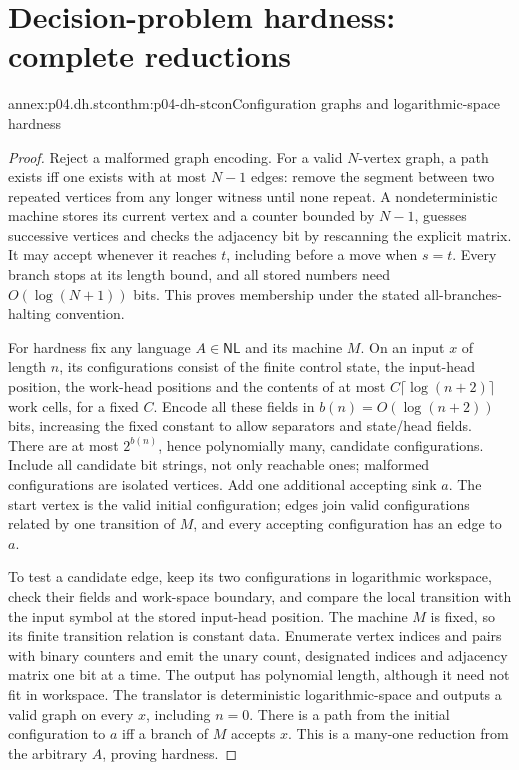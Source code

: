 \section{Decision-problem hardness: complete reductions}
\label{sec:annex-p04-decision-hardness}

\begin{annexitem}{annex:p04.dh.stcon}{thm:p04-dh-stcon}{Configuration graphs and logarithmic-space hardness}
\begin{proof}
Reject a malformed graph encoding. For a valid \(N\)-vertex graph, a path
exists iff one exists with at most \(N-1\) edges: remove the segment between
two repeated vertices from any longer witness until none repeat. A
nondeterministic machine stores its current vertex and a counter bounded
by \(N-1\), guesses successive vertices and checks the adjacency bit by
rescanning the explicit matrix. It may accept whenever it reaches \(t\),
including before a move when \(s=t\). Every branch stops at its length
bound, and all stored numbers need \(O(\log(N+1))\) bits. This proves
membership under the stated all-branches-halting convention.

For hardness fix any language \(A\in\mathsf{NL}\) and its machine \(M\).
On an input \(x\) of length \(n\), its configurations consist of the finite
control state, the input-head position, the work-head positions and the
contents of at most \(C\lceil\log(n+2)\rceil\) work cells, for a fixed \(C\).
Encode all these fields in \(b(n)=O(\log(n+2))\) bits, increasing the fixed
constant to allow separators and state/head fields. There are at most
\(2^{b(n)}\), hence polynomially many, candidate configurations. Include
all candidate bit strings, not only reachable ones; malformed configurations
are isolated vertices. Add one additional accepting sink \(a\).
The start vertex is the valid initial configuration; edges join valid
configurations related by one transition of \(M\), and every accepting
configuration has an edge to \(a\).

To test a candidate edge, keep its two configurations in logarithmic
workspace, check their fields and work-space boundary, and compare the
local transition with the input symbol at the stored input-head position.
The machine \(M\) is fixed, so its finite transition relation is constant
data. Enumerate vertex indices and pairs with binary counters and emit the
unary count, designated indices and adjacency matrix one bit at a time.
The output has polynomial length, although it need not fit in workspace.
The translator is deterministic logarithmic-space and outputs a valid
graph on every \(x\), including \(n=0\). There is a path from the initial
configuration to \(a\) iff a branch of \(M\) accepts \(x\). This is a
many-one reduction from the arbitrary \(A\), proving hardness.


\end{proof}
\end{annexitem}
